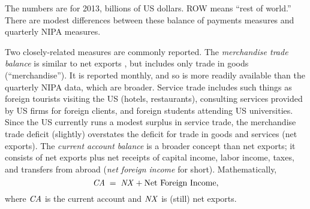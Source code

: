 \begin{table}[b!]
\centering
\caption{US balance of payments. }

\begin{minipage}{0.80\textwidth}
\footnotesize{The numbers are for 2013, billions of US dollars.
ROW means ``rest of world.''
There are modest differences between these balance of payments measures and quarterly NIPA measures.}
\end{minipage}
\label{tab:usbop}
\end{table}

Two closely-related measures are commonly reported.  The {\it
merchandise trade balance\/} is similar to net exports
, but includes only trade in goods (``merchandise'').  It is reported monthly, and
so is more readily available than the quarterly NIPA data, which are broader.
Service trade includes such things as foreign tourists visiting the US (hotels,
restaurants), consulting services provided by US firms for foreign
clients, and foreign students attending US universities. Since the
US currently runs a modest surplus in service trade, the merchandise
trade deficit (slightly) overstates the deficit for trade in goods
and services (net exports).
The {\it current account balance\/} is a broader concept than net exports;
it consists of net exports plus net receipts of capital income, labor
income, taxes, and transfers from abroad
({\it net foreign income\/} for short).
Mathematically,
\[
    \mbox{\em CA\/} \;=\; \mbox{\em NX\/} + \mbox{Net Foreign Income} ,
\]
where $\mbox{\em CA\/}$ is the current account and $\mbox{\em NX\/}$ is (still) net exports.

